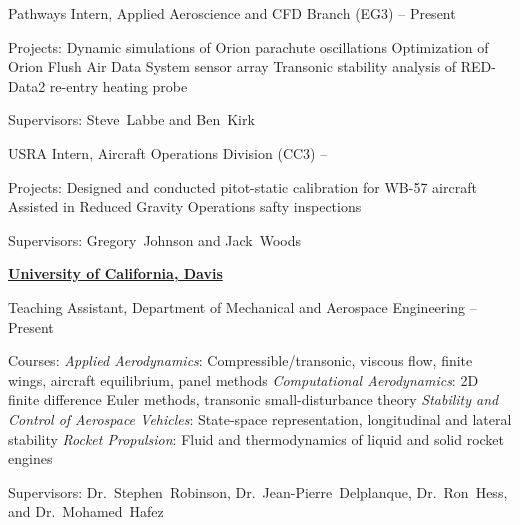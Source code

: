 \documentclass[letterpaper,MMMyyyy,nonstop]{simpleresumecv}
\begin{document}
\begin{body}
\GapNoBreak
\BulletItem
Pathways Intern, Applied Aeroscience and CFD Branch (EG3)
\hfill
{} --
Present
\begin{detail}
\SubItem
Projects:
\SubBulletItem
Dynamic simulations of Orion parachute oscillations
\SubBulletItem
Optimization of Orion Flush Air Data System sensor array
\SubBulletItem
Transonic stability analysis of RED-Data2 re-entry heating probe

\SubItem
Supervisors:
Steve~Labbe and
Ben~Kirk
\end{detail}

\GapNoBreak
\BulletItem
USRA Intern, Aircraft Operations Division (CC3)
\hfill
{} --
\begin{detail}
\SubItem
Projects:
\SubBulletItem
Designed and conducted pitot-static calibration for WB-57 aircraft
\SubBulletItem
Assisted in Reduced Gravity Operations safty inspections

\SubItem
Supervisors:
Gregory~Johnson and
Jack~Woods
\end{detail}


\Gap

\href{http://mae.ucdavis.edu/}
{\textbf{University of California, Davis}}

\GapNoBreak
\BulletItem
Teaching Assistant, Department of Mechanical and Aerospace Engineering
\hfill
{} --
Present
\begin{detail}
\SubItem
Courses:
\SubBulletItem
\emph{Applied Aerodynamics}:  Compressible/transonic, viscous flow, finite wings, aircraft equilibrium, panel methods
\SubBulletItem
\emph{Computational Aerodynamics}:  2D finite difference Euler methods, transonic small-disturbance theory
\SubBulletItem
\emph{Stability and Control of Aerospace Vehicles}:  State-space representation, longitudinal and lateral stability
\SubBulletItem
\emph{Rocket Propulsion}:  Fluid and thermodynamics of liquid and solid rocket engines

\SubItem
Supervisors:
Dr.~Stephen~Robinson,
Dr.~Jean-Pierre~Delplanque,
Dr.~Ron~Hess, and
Dr.~Mohamed~Hafez


\end{detail}






\end{body}
\end{document}
